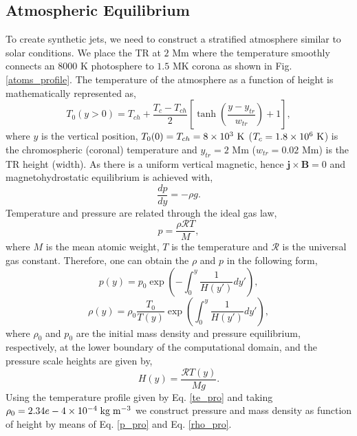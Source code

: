 \documentclass[12pt]{ociamthesis}
\newcommand{\bs}[1]{\boldsymbol{#1}}
\newcommand{\rgas}{\mathcal{R}}
\newcommand{\eref}[1]{Eq. \eqref{#1}}
\newcommand{\fref}[1]{Fig. \eqref{#1}}
\begin{document}
\subsection{Atmospheric Equilibrium}
\label{sec:atmos_equil}
To create synthetic jets, we need to construct a stratified atmosphere similar to solar conditions. We place the TR at $2$ Mm where the temperature smoothly connects an $8000$ K photosphere to $1.5$ MK corona as shown in \fref{atoms_profile}. The temperature of the atmosphere as a function of height is mathematically represented as,   
\begin{equation}\label{te_pro}
T_0(y>0) = T_{ch}+\frac{T_{c} - T_{ch}}{2} \left[ \tanh \left( \frac{y-y_{tr}}{w_{tr}} \right)+1 \right],
\end{equation}
where $y$ is the vertical position, $T_0(0)=T_{ch}=8\times10^3 \ \rm{K}$ ($T_{c}=1.8\times10^6 \ \rm{K}$) is the chromospheric (coronal) temperature and $y_{tr}=2$ Mm ($w_{tr}=0.02$ Mm) is the TR height (width). As there is a uniform vertical magnetic, hence $\bs{j} \times \bs{B}=0$ and magnetohydrostatic equilibrium is achieved with,
\begin{equation}
\frac{dp}{dy} = - \rho g.
\end{equation}
Temperature and pressure are related through the ideal gas law,
\begin{equation}
p = \frac{ \rho \rgas T}{M},
\end{equation} 
where $M$ is the mean atomic weight, $T$ is the temperature and $\rgas$ is the universal gas constant. Therefore, one can obtain the $\rho$ and $p$ in the following form,  
\begin{equation}\label{p_pro}
p(y) = p_0 \exp \left( - \int_0^y  \frac{1}{H(y')} dy' \right), 
\end{equation} 
\begin{equation}\label{rho_pro}
\rho(y) = \rho_0 \frac{T_0}{T(y)} \exp \left( \int_0^y \frac{1}{H(y') }dy' \right),
\end{equation}
where $\rho_0$ and $p_0$ are the initial mass density and pressure equilibrium, respectively, at the lower boundary of the computational domain, and the pressure scale heights are given by,
\begin{equation}
H(y) = \frac{\rgas T(y)}{Mg}.
\end{equation}
Using the temperature profile given by \eref{te_pro} and taking $\rho_0 = 2.34e-4\times10^{-4}\;\rm{kg}\;\rm{m^{-3}}$ we construct pressure and mass density as function of height by means of \eref{p_pro} and \eref{rho_pro}.
\end{document}
